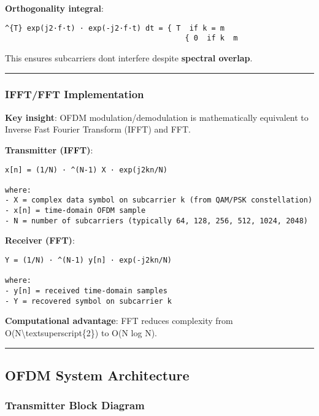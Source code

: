 \textbf{Orthogonality integral}:

\begin{verbatim}
^{T} exp(j2·f·t) · exp(-j2·f·t) dt = { T  if k = m
                                         { 0  if k  m
\end{verbatim}

This ensures subcarriers don\textquotesingle t interfere despite
\textbf{spectral overlap}.

\begin{center}\rule{0.5\linewidth}{0.5pt}\end{center}

\subsubsection{IFFT/FFT Implementation}\label{ifftfft-implementation}

\textbf{Key insight}: OFDM modulation/demodulation is mathematically
equivalent to Inverse Fast Fourier Transform (IFFT) and FFT.

\textbf{Transmitter (IFFT)}:

\begin{verbatim}
x[n] = (1/N) · ^(N-1) X · exp(j2kn/N)

where:
- X = complex data symbol on subcarrier k (from QAM/PSK constellation)
- x[n] = time-domain OFDM sample
- N = number of subcarriers (typically 64, 128, 256, 512, 1024, 2048)
\end{verbatim}

\textbf{Receiver (FFT)}:

\begin{verbatim}
Y = (1/N) · ^(N-1) y[n] · exp(-j2kn/N)

where:
- y[n] = received time-domain samples
- Y = recovered symbol on subcarrier k
\end{verbatim}

\textbf{Computational advantage}: FFT reduces complexity from
O(N\textbackslash textsuperscript\{2\}) to O(N log N).

\begin{center}\rule{0.5\linewidth}{0.5pt}\end{center}

\subsection{\texorpdfstring{ OFDM System
Architecture}{ OFDM System Architecture}}\label{ofdm-system-architecture}

\subsubsection{Transmitter Block
Diagram}\label{transmitter-block-diagram}

